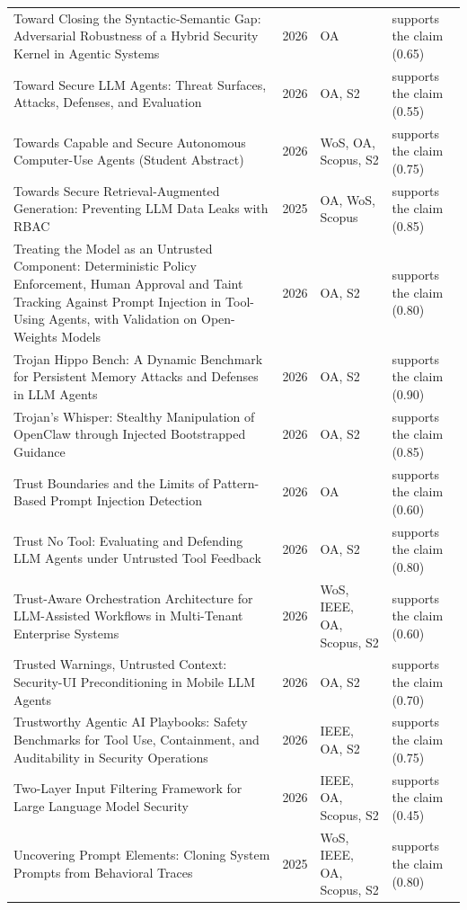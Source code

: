 \begin{longtable}{@{}%
  >{\raggedright\arraybackslash}p{}c%
  >{\raggedright\arraybackslash}p{}%
  >{\raggedright\arraybackslash}p{}@{}}
Toward Closing the Syntactic-Semantic Gap: Adversarial Robustness of a Hybrid Security Kernel in Agentic Systems & 2026 & OA & supports the claim (0.65) \\
Toward Secure LLM Agents: Threat Surfaces, Attacks, Defenses, and Evaluation & 2026 & OA, S2 & supports the claim (0.55) \\
Towards Capable and Secure Autonomous Computer-Use Agents (Student Abstract) & 2026 & WoS, OA, Scopus, S2 & supports the claim (0.75) \\
Towards Secure Retrieval-Augmented Generation: Preventing LLM Data Leaks with RBAC & 2025 & OA, WoS, Scopus & supports the claim (0.85) \\
Treating the Model as an Untrusted Component: Deterministic Policy Enforcement, Human Approval and Taint Tracking Against Prompt Injection in Tool-Using Agents, with Validation on Open-Weights Models & 2026 & OA, S2 & supports the claim (0.80) \\
Trojan Hippo Bench: A Dynamic Benchmark for Persistent Memory Attacks and Defenses in LLM Agents & 2026 & OA, S2 & supports the claim (0.90) \\
Trojan's Whisper: Stealthy Manipulation of OpenClaw through Injected Bootstrapped Guidance & 2026 & OA, S2 & supports the claim (0.85) \\
Trust Boundaries and the Limits of Pattern-Based Prompt Injection Detection & 2026 & OA & supports the claim (0.60) \\
Trust No Tool: Evaluating and Defending LLM Agents under Untrusted Tool Feedback & 2026 & OA, S2 & supports the claim (0.80) \\
Trust-Aware Orchestration Architecture for LLM-Assisted Workflows in Multi-Tenant Enterprise Systems & 2026 & WoS, IEEE, OA, Scopus, S2 & supports the claim (0.60) \\
Trusted Warnings, Untrusted Context: Security-UI Preconditioning in Mobile LLM Agents & 2026 & OA, S2 & supports the claim (0.70) \\
Trustworthy Agentic AI Playbooks: Safety Benchmarks for Tool Use, Containment, and Auditability in Security Operations & 2026 & IEEE, OA, S2 & supports the claim (0.75) \\
Two-Layer Input Filtering Framework for Large Language Model Security & 2026 & IEEE, OA, Scopus, S2 & supports the claim (0.45) \\
Uncovering Prompt Elements: Cloning System Prompts from Behavioral Traces & 2025 & WoS, IEEE, OA, Scopus, S2 & supports the claim (0.80) \\

\end{longtable}
